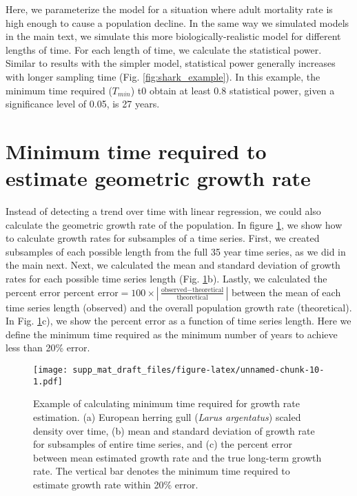 \documentclass[12pt,]{article}
\begin{document}
Here, we parameterize the model for a situation where adult mortality
rate is high enough to cause a population decline. In the same way we
simulated models in the main text, we simulate this more
biologically-realistic model for different lengths of time. For each
length of time, we calculate the statistical power. Similar to results
with the simpler model, statistical power generally increases with
longer sampling time (Fig. \ref{fig:shark_example}). In this example,
the minimum time required (\(T_{min}\)) t0 obtain at least 0.8
statistical power, given a significance level of 0.05, is 27 years.

\section{Minimum time required to estimate geometric growth
rate}\label{minimum-time-required-to-estimate-geometric-growth-rate}

Instead of detecting a trend over time with linear regression, we could
also calculate the geometric growth rate of the population. In figure
\ref{fig:growth_rate}, we show how to calculate growth rates for
subsamples of a time series. First, we created subsamples of each
possible length from the full 35 year time series, as we did in the main
next. Next, we calculated the mean and standard deviation of growth
rates for each possible time series length (Fig.
\ref{fig:growth_rate}b). Lastly, we calculated the percent error
\(\mbox{percent error} = 100 \times \left| \frac{\mbox{observed} - \mbox{theoretical}}{\mbox{theoretical}} \right|\)
between the mean of each time series length (observed) and the overall
population growth rate (theoretical). In Fig. \ref{fig:growth_rate}c),
we show the percent error as a function of time series length. Here we
define the minimum time required as the minimum number of years to
achieve less than 20\% error.

\begin{figure}[htbp]
\centering
\texttt{[image: supp\_mat\_draft\_files/figure-latex/unnamed-chunk-10-1.pdf]}
\caption{Example of calculating minimum time required for growth rate
estimation. (a) European herring gull (\emph{Larus argentatus}) scaled
density over time, (b) mean and standard deviation of growth rate for
subsamples of entire time series, and (c) the percent error between mean
estimated growth rate and the true long-term growth rate. The vertical
bar denotes the minimum time required to estimate growth rate within
20\% error.\label{fig:growth_rate}}
\end{figure}
\end{document}
